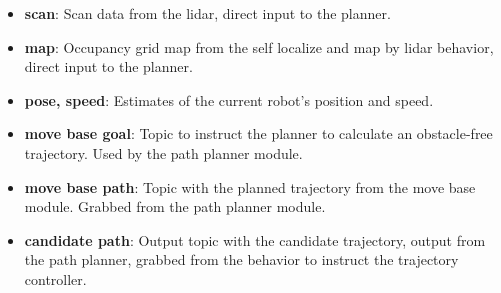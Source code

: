   \begin{itemize}
    \item \textbf{scan}: Scan data from the lidar, direct input to the planner.
    \item \textbf{map}: Occupancy grid map from the self localize and map by lidar behavior, direct input to the planner.
    \item \textbf{pose, speed}: Estimates of the current robot's position and speed.
    \item \textbf{move base goal}: Topic to instruct the planner to calculate an obstacle-free trajectory. Used by the path planner module.
    \item \textbf{move base path}: Topic with the planned trajectory from the move base module. Grabbed from the path planner module.
    \item \textbf{candidate path}: Output topic with the candidate trajectory, output from the path planner, grabbed from the behavior to instruct the trajectory controller.
  \end{itemize}

